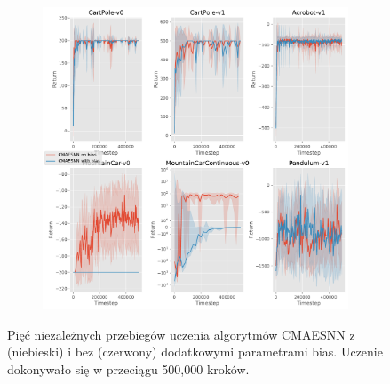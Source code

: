 \documentclass[12pt,a4paper]{article}
\begin{document}
\begin{figure}[ht!]
  \begin{subfigure}[ht!]{0.35\textwidth}
    \includegraphics[width=\textwidth]{../plotting/plots/plot_bias_perf4.pdf}
    \caption{}
  \end{subfigure}
  \caption{Pięć niezależnych przebiegów uczenia algorytmów CMAESNN
    z (niebieski) i bez (czerwony) dodatkowymi parametrami bias.
    Uczenie dokonywało się w przeciągu 500,000 kroków.}
\end{figure}
\end{document}
